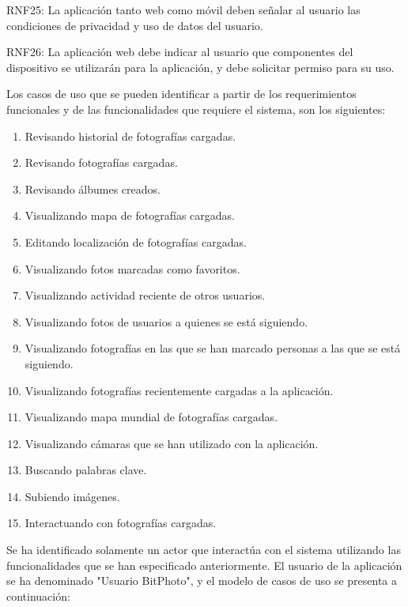 \documentclass{memoria}
\begin{document}
RNF25: La aplicación tanto web como móvil deben señalar al usuario las condiciones de privacidad y uso de datos del usuario.

RNF26: La aplicación web debe indicar al usuario que componentes del dispositivo se utilizarán para la aplicación, y debe solicitar permiso para su uso.



Los casos de uso que se pueden identificar a partir de los requerimientos funcionales y de las funcionalidades que requiere el sistema, son los siguientes:

\begin{enumerate}
    \item Revisando historial de fotografías cargadas.
    \item Revisando fotografías cargadas.
    \item Revisando álbumes creados.
    \item Visualizando mapa de fotografías cargadas.
    \item Editando localización de fotografías cargadas.
    \item Visualizando fotos marcadas como favoritos.
    \item Visualizando actividad reciente de otros usuarios.
    \item Visualizando fotos de usuarios a quienes se está siguiendo.
    \item Visualizando fotografías en las que se han marcado personas a las que se está siguiendo.
    \item Visualizando fotografías recientemente cargadas a la aplicación.
    \item Visualizando mapa mundial de fotografías cargadas.
    \item Visualizando cámaras que se han utilizado con la aplicación.
    \item Buscando palabras clave.
    \item Subiendo imágenes.
    \item Interactuando con fotografías cargadas.
\end{enumerate}
\newpage


Se ha identificado solamente un actor que interactúa con el sistema utilizando las funcionalidades que se han especificado anteriormente. El usuario de la aplicación se ha denominado "Usuario BitPhoto", y el modelo de casos de uso se presenta a continuación:\\
\end{document}
